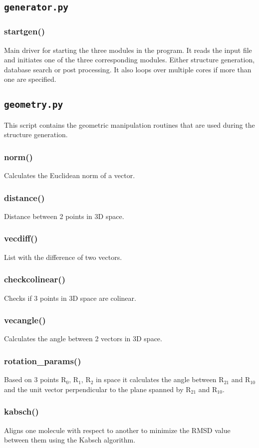 \documentclass[a4paper,12pt]{assignment}
\begin{document}
\subsection{\texttt{generator.py}}
\subsubsection{startgen()}
Main driver for starting the three modules in the program. It reads the input file and initiates one of the three corresponding modules. Either structure generation, database search or post processing. It also loops over multiple cores if more than one are specified.

\subsection{\texttt{geometry.py}}
This script contains the geometric manipulation routines that are used during the structure generation.
\subsubsection{norm()}
Calculates the Euclidean norm of a vector.
\subsubsection{distance()}
Distance between 2 points in 3D space.
\subsubsection{vecdiff()}
List with the difference of two vectors.
\subsubsection{checkcolinear()}
Checks if 3 points in 3D space are colinear. 
\subsubsection{vecangle()}
Calculates the angle between 2 vectors in 3D space.
\subsubsection{rotation_params()}
Based on 3 points R$_0$, R$_1$, R$_2$ in space it calculates the angle between R$_{21}$ and R$_{10}$ and the unit vector perpendicular to the plane spanned by R$_{21}$ and R$_{10}$.
\subsubsection{kabsch()}
Aligns one molecule with respect to another to minimize the RMSD value between them using the Kabsch algorithm.
\end{document}
